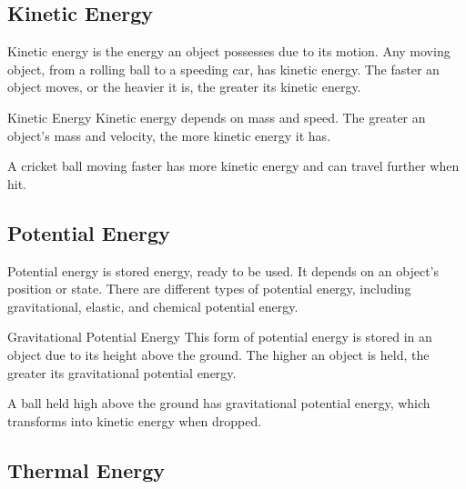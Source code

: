 \subsection{Kinetic Energy}

Kinetic energy is the energy an object possesses due to its motion. Any moving object, from a rolling ball to a speeding car, has kinetic energy. The faster an object moves, or the heavier it is, the greater its kinetic energy.


\begin{keyconcept}{Kinetic Energy}
Kinetic energy depends on mass and speed. The greater an object's mass and velocity, the more kinetic energy it has.
\end{keyconcept}


\begin{example}
A cricket ball moving faster has more kinetic energy and can travel further when hit.
\end{example}

\subsection{Potential Energy}

Potential energy is stored energy, ready to be used. It depends on an object's position or state. There are different types of potential energy, including gravitational, elastic, and chemical potential energy.


\begin{keyconcept}{Gravitational Potential Energy}
This form of potential energy is stored in an object due to its height above the ground. The higher an object is held, the greater its gravitational potential energy.
\end{keyconcept}

\begin{example}
A ball held high above the ground has gravitational potential energy, which transforms into kinetic energy when dropped.
\end{example}

\subsection{Thermal Energy}

